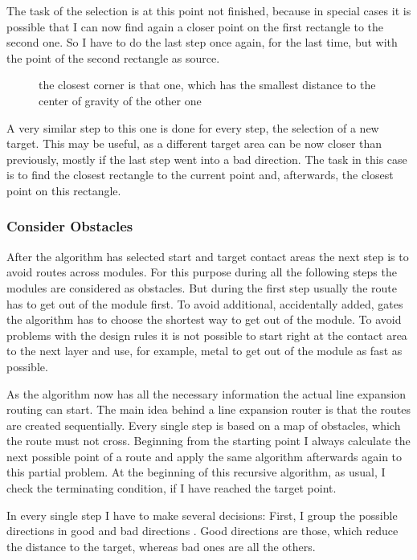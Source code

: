 The task of the selection is at this point not finished, because in special cases it is possible that I can now find again a closer point on the first rectangle to the second one. So I have to do the last step once again, for the last time, but with the point of the second rectangle as source.

\begin{figure}
	\centering
	
  	\caption{the closest corner is that one, which has the smallest distance to the center of gravity of the other one}
	\label{fig:rectangles_closest_corner}
\end{figure}

A very similar step to this one is done for every step, the selection of a new target. This may be useful, as a different target area can be now closer than previously, mostly if the last step went into a bad direction. The task in this case is to find the closest rectangle to the current point and, afterwards, the closest point on this rectangle.

\subsubsection{Consider Obstacles}
After the algorithm has selected start and target contact areas the next step is to avoid routes across modules. For this purpose during all the following steps the modules are considered as obstacles. But during the first step usually the route has to get out of the module first. To avoid additional, accidentally added, gates the algorithm has to choose the shortest way to get out of the module. To avoid problems with the design rules it is not possible to start right at the contact area to the next layer and use, for example, metal to get out of the module as fast as possible.

As the algorithm now has all the necessary information the actual line expansion routing can start. The main idea behind a line expansion router is that the routes are created sequentially. Every single step is based on a map of obstacles, which the route must not cross. Beginning from the starting point I always calculate the next possible point of a route and apply the same algorithm afterwards again to this partial problem. At the beginning of this recursive algorithm, as usual, I check the terminating condition, if I have reached the target point.

In every single step I have to make several decisions: First, I group the possible directions in good and bad directions . Good directions are those, which reduce the distance to the target, whereas bad ones are all the others.

